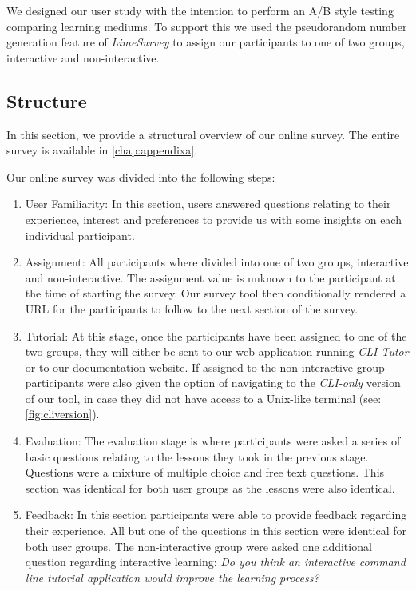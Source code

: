 We designed our user study with the intention to perform an A/B style testing
comparing learning mediums. To support this we used the pseudorandom number
generation feature of \textit{LimeSurvey} to assign our participants to one of
two groups, interactive and non-interactive.

\subsection{Structure}

In this section, we provide a structural overview of our online survey. The
entire survey is available in \autoref{chap:appendixa}.

Our online survey was divided into the following steps:

\begin{enumerate}

	\item User Familiarity: In this section, users answered questions relating
	      to their experience, interest and preferences to provide us with some
	      insights on each individual participant.

	\item Assignment: All participants where divided into one of two groups,
	      interactive and non-interactive. The assignment value is unknown to the
	      participant at the time of starting the survey. Our survey tool then
	      conditionally rendered a URL for the participants to follow to the next
	      section of the survey.

	\item Tutorial: At this stage, once the participants have been assigned to
	      one of the two groups, they will either be sent to our web application
	      running \textit{CLI-Tutor} or to our documentation website. If assigned
	      to the non-interactive group participants were also given the option of
	      navigating to the  \textit{CLI-only} version of our tool, in case they
	      did not have access to a Unix-like terminal (see:
	      \autoref{fig:cliversion}).

	\item Evaluation: The evaluation stage is where participants were asked a
	      series of basic questions relating to the lessons they took in the
	      previous stage. Questions were a mixture of multiple choice and free
	      text questions. This section was identical for both user groups as the
	      lessons were also identical.

	\item Feedback: In this section participants were able to provide feedback
	      regarding their experience. All but one of the questions in this
	      section were identical for both user groups. The non-interactive group
	      were asked one additional question regarding interactive learning:
	      \textit{Do you think an interactive command line tutorial application
		      would improve the learning process?}


\end{enumerate}

